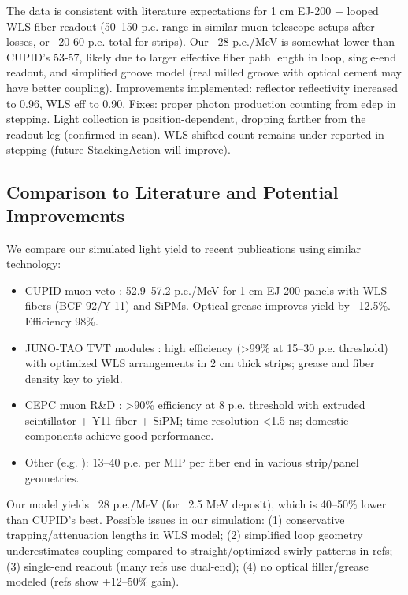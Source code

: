 \documentclass[11pt,a4paper]{article}
\begin{document}
The data is consistent with literature expectations for 1 cm EJ-200 + looped WLS fiber readout (50--150 p.e. range in similar muon telescope setups after losses, or ~20-60 p.e. total for strips). Our ~28 p.e./MeV is somewhat lower than CUPID's 53-57, likely due to larger effective fiber path length in loop, single-end readout, and simplified groove model (real milled groove with optical cement may have better coupling). Improvements implemented: reflector reflectivity increased to 0.96, WLS eff to 0.90. Fixes: proper photon production counting from edep in stepping. Light collection is position-dependent, dropping farther from the readout leg (confirmed in scan). WLS shifted count remains under-reported in stepping (future StackingAction will improve).

\subsection{Comparison to Literature and Potential Improvements}
We compare our simulated light yield to recent publications using similar technology:

\begin{itemize}
\item CUPID muon veto \cite{cupid-muon}: 52.9--57.2 p.e./MeV for 1 cm EJ-200 panels with WLS fibers (BCF-92/Y-11) and SiPMs. Optical grease improves yield by ~12.5\%. Efficiency 98\%.
\item JUNO-TAO TVT modules \cite{juno-tao,juno-tao-compact}: high efficiency (>99\% at 15--30 p.e. threshold) with optimized WLS arrangements in 2 cm thick strips; grease and fiber density key to yield.
\item CEPC muon R\&D \cite{cepc-muon}: >90\% efficiency at 8 p.e. threshold with extruded scintillator + Y11 fiber + SiPM; time resolution <1.5 ns; domestic components achieve good performance.
\item Other (e.g. \cite{ar5iv,2401.04630}): 13--40 p.e. per MIP per fiber end in various strip/panel geometries.
\end{itemize}

Our model yields ~28 p.e./MeV (for ~2.5 MeV deposit), which is 40--50\% lower than CUPID's best. Possible issues in our simulation: (1) conservative trapping/attenuation lengths in WLS model; (2) simplified loop geometry underestimates coupling compared to straight/optimized swirly patterns in refs; (3) single-end readout (many refs use dual-end); (4) no optical filler/grease modeled (refs show +12--50\% gain). 
\end{document}

